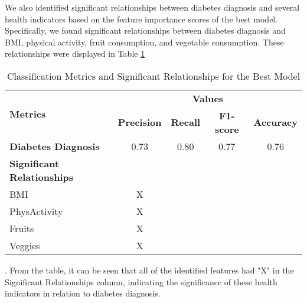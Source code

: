 \documentclass[12pt]{article}
\begin{document}
We also identified significant relationships between diabetes diagnosis and several health indicators based on the feature importance scores of the best model. Specifically, we found significant relationships between diabetes diagnosis and BMI, physical activity, fruit consumption, and vegetable consumption. These relationships were displayed in Table \ref{table:results_summary}\begin{table}[htbp]
\centering
\caption{Classification Metrics and Significant Relationships for the Best Model}
\label{table:results_summary}
\begin{tabular}{@{}lcccc@{}}
\toprule
\multirow{2}{*}{\textbf{Metrics}} & \multicolumn{4}{c}{\textbf{Values}}                         \\ \cmidrule(l){2-5}
                                   & \textbf{Precision} & \textbf{Recall} & \textbf{F1-score} & \textbf{Accuracy} \\ \midrule
\textbf{Diabetes Diagnosis}        & 0.73              & 0.80            & 0.77              & 0.76                  \\ \midrule
\textbf{Significant Relationships} &                   &                 &                   &                      \\
\quad BMI                          & X                 &                 &                   &                      \\
\quad PhysActivity                 & X                 &                 &                   &                      \\
\quad Fruits                       & X                 &                 &                   &                      \\
\quad Veggies                      & X                 &                 &                   &                      \\ \bottomrule
\end{tabular}
\end{table}. From the table, it can be seen that all of the identified features had "X" in the Significant Relationships column, indicating the significance of these health indicators in relation to diabetes diagnosis.  
\end{document}
